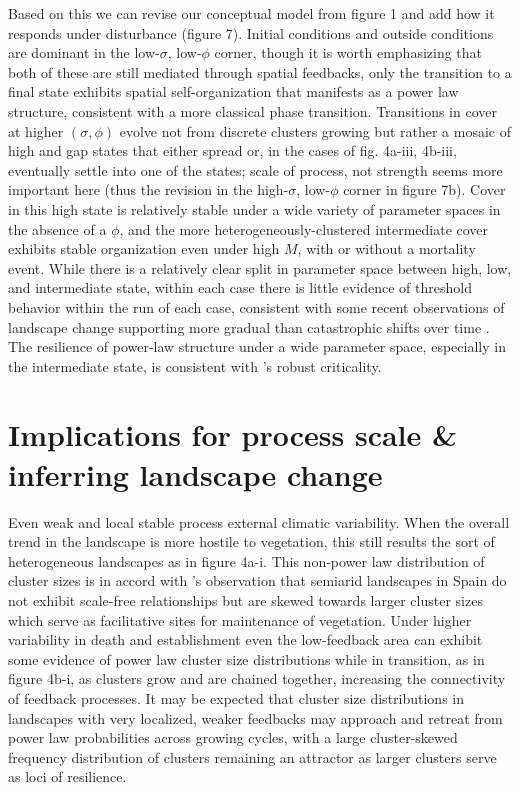 \documentclass[10pt]{article}
\begin{document}
\begin{linenumbers}
Based on this we can revise our conceptual model from figure 1 and add how it responds under disturbance (figure 7). Initial conditions and outside conditions are dominant in the low-$\sigma$, low-$\phi$ corner, though it is worth emphasizing that both of these are still mediated through spatial feedbacks, only the transition to a final state exhibits spatial self-organization that manifests as a power law structure, consistent with a more classical phase transition. Transitions in cover at higher $(\sigma,\phi)$ evolve not from discrete clusters growing but rather a mosaic of high and gap states that either spread or, in the cases of fig. 4a-iii, 4b-iii, eventually settle into one of the states; scale of process, not strength seems more important here (thus the revision in the high-$\sigma$, low-$\phi$ corner in figure 7b). Cover in this high state is relatively stable under a wide variety of parameter spaces in the absence of a $\phi$, and the more heterogeneously-clustered intermediate cover exhibits stable organization even under high $M$, with or without a mortality event. While there is a relatively clear split in parameter space between high, low, and intermediate state, within each case there is little evidence of threshold behavior within the run of each case, consistent with some recent observations of landscape change supporting more gradual than catastrophic shifts over time \citep{Bhattachan2014}. The resilience of power-law structure under a wide parameter space, especially in the intermediate state, is consistent with \citet{Pascual2005}'s robust criticality.

\section{Implications for process scale \& inferring landscape change}

Even weak and local stable process external climatic variability. When the overall trend in the landscape is more hostile to vegetation, this still results the sort of heterogeneous landscapes as in figure 4a-i. This non-power law distribution of cluster sizes is in accord with \citet{Maestre2009}'s observation that semiarid landscapes in Spain do not exhibit scale-free relationships but are skewed towards larger cluster sizes which serve as facilitative sites for maintenance of vegetation. Under higher variability in death and establishment even the low-feedback area can exhibit some evidence of power law cluster size distributions while in transition, as in figure 4b-i, as clusters grow and are chained together, increasing the connectivity of feedback processes. It may be expected that cluster size distributions in landscapes with very localized, weaker feedbacks may approach and retreat from power law probabilities across growing cycles, with a large cluster-skewed frequency distribution of clusters remaining an attractor as larger clusters serve as loci of resilience. 


\end{linenumbers}
\end{document}
